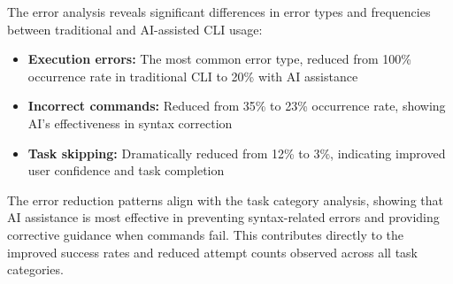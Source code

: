 The error analysis reveals significant differences in error types and frequencies between traditional and AI-assisted CLI usage:

\begin{itemize}
	\item \textbf{Execution errors:} The most common error type, reduced from 100\% occurrence rate in traditional CLI to 20\% with AI assistance
	\item \textbf{Incorrect commands:} Reduced from 35\% to 23\% occurrence rate, showing AI's effectiveness in syntax correction
	\item \textbf{Task skipping:} Dramatically reduced from 12\% to 3\%, indicating improved user confidence and task completion
\end{itemize}

The error reduction patterns align with the task category analysis, showing that AI assistance is most effective in preventing syntax-related errors and providing corrective guidance when commands fail. This contributes directly to the improved success rates and reduced attempt counts observed across all task categories.


